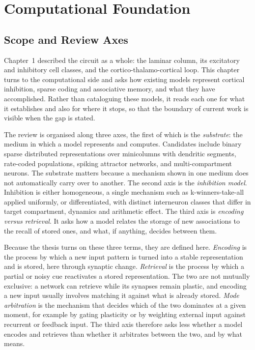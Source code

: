 \providecommand{\unitname}{chapter}
\providecommand{\bioref}{Chapter~1}
\providecommand{\biosec}[2]{#1}
\providecommand{\gapref}{Chapter~3}
\chapter{Computational Foundation}
\label{ch:comp}

\section{Scope and Review Axes}
\label{sec:comp-scope}

\bioref{} described the circuit as a whole: the laminar column, its excitatory
and inhibitory cell classes, and the cortico-thalamo-cortical loop. This
\unitname{} turns to the computational side and asks how existing models represent
cortical inhibition, sparse coding and associative memory, and what they have
accomplished. Rather than cataloguing these models, it reads each one for what
it establishes and also for where it stops, so that the boundary of current
work is visible when the gap is stated.

The review is organised along three axes, the first of which is the
\emph{substrate}: the medium in which a model represents and computes.
Candidates include binary sparse distributed representations over minicolumns
with dendritic segments, rate-coded populations, spiking attractor networks,
and multi-compartment neurons. The substrate matters because a mechanism shown
in one medium does not automatically carry over to another. The second axis is
the \emph{inhibition model}. Inhibition is either homogeneous, a single
mechanism such as k-winners-take-all applied uniformly, or differentiated,
with distinct interneuron classes that differ in target compartment, dynamics
and arithmetic effect. The third axis is \emph{encoding versus retrieval}. It
asks how a model relates the storage of new associations to the recall of
stored ones, and what, if anything, decides between them.

Because the thesis turns on these three terms, they are defined here.
\emph{Encoding} is the process by which a new input pattern is turned into a
stable representation and is stored, here through synaptic change.
\emph{Retrieval} is the process by which a partial or noisy cue reactivates a
stored representation. The two are not mutually exclusive: a network can
retrieve while its synapses remain plastic, and encoding a new input usually
involves matching it against what is already stored. \emph{Mode arbitration}
is the mechanism that decides which of the two dominates at a given moment,
for example by gating plasticity or by weighting external input against
recurrent or feedback input. The third axis therefore asks less whether a
model encodes and retrieves than whether it arbitrates between the two, and by
what means.


